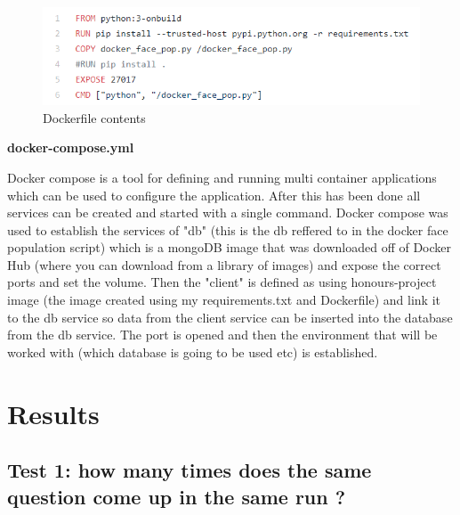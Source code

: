 \documentclass[12pt,a4paper]{article}
\begin{document}
\begin{figure}[!ht]
    \centering
    \includegraphics[width=1.0\textwidth]{Figs/Dockerfile.PNG} 
    \caption{Dockerfile contents} 
    \label{Dockerfile}
\end{figure}  

\textbf{docker-compose.yml} 

Docker compose is a tool for defining and running multi container applications which can be used to configure the application. After this has been done all services can be created and started with a single command. Docker compose was used to establish the services of "db" (this is the db reffered to in the docker face population script) which is a mongoDB image that was downloaded off of Docker Hub (where you can download from a library of images) and expose the correct ports and set the volume. Then the "client" is defined as using honours-project image (the image created using my requirements.txt and Dockerfile) and link it to the db service so data from the client service can be inserted into the database from the db service. The port is opened and then the environment that will be worked with (which database is going to be used etc) is established.

\newpage
\section{Results} 
\subsection{Test 1: how many times does the same question come up in the same run ?}  
\end{document}
